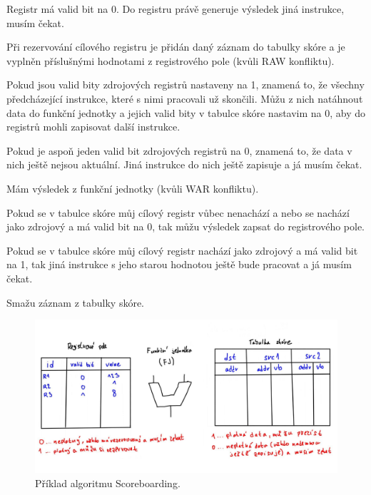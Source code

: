 \begin{compactitem}
\begin{compactenum}
\begin{compactenum}
            \item Registr má valid bit na 0. Do registru právě generuje výsledek jiná instrukce, musím čekat.
        \end{compactenum}

        \item Při rezervování cílového registru je přidán daný záznam do tabulky skóre a je vyplněn příslušnými hodnotami z registrového pole (kvůli RAW konfliktu). \begin{compactenum}
            \item Pokud jsou valid bity zdrojových registrů nastaveny na 1, znamená to, že všechny předcházející instrukce, které s nimi pracovali už skončili. Můžu z nich natáhnout data do funkční jednotky a jejich valid bity v tabulce skóre nastavim na 0, aby do registrů mohli zapisovat další instrukce.
            \item Pokud je aspoň jeden valid bit zdrojových registrů na 0, znamená to, že data v nich ještě nejsou aktuální. Jiná instrukce do nich ještě zapisuje a já musím čekat.
        \end{compactenum}

        \item Mám výsledek z funkční jednotky (kvůli WAR konfliktu). \begin{compactenum}
            \item Pokud se v tabulce skóre můj cílový registr vůbec nenachází a nebo se nachází jako zdrojový a má valid bit na 0, tak můžu výsledek zapsat do registrového pole.
            \item Pokud se v tabulce skóre můj cílový registr nachází jako zdrojový a má valid bit na 1, tak jiná instrukce s jeho starou hodnotou ještě bude pracovat a já musím čekat.
        \end{compactenum}

        \item Smažu záznam z tabulky skóre.
    \end{compactenum}

    \begin{figure}[H]
        \centering
        \includegraphics[width=1\linewidth]{example_score_board.jpg}
        \caption{Příklad algoritmu Scoreboarding.}
    \end{figure}
\end{compactitem}

